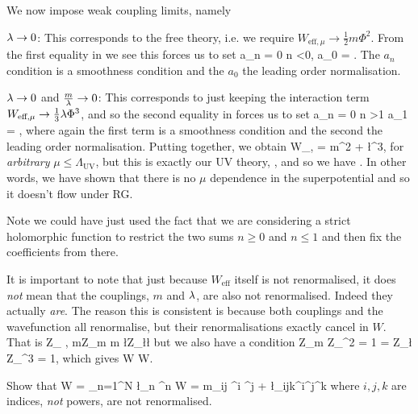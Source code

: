        \item We now impose weak coupling limits, namely 
            \ben
                \item $\lambda\to 0$: This corresponds to the free theory, i.e. we require $W_{\text{eff},\mu} \to \frac{1}{2}m\Phi^2$. From the first equality in  we see this forces us to set 
                \be
                \label{eqn:ana0}
                    a_n = 0 \qquad \forall n <0, \qand a_0 = .
                \ee 
                The $a_n$ condition is a smoothness condition and the $a_0$ the leading order normalisation.
                \item $\lambda\to0$ and $\frac{m}{\lambda}\to 0$: This corresponds to just keeping the interaction term $W_{\text{eff},\mu}\to \frac{1}{3}\lambda \Phi^3$, and so the second equality in  forces us to set 
                \be 
                \label{eqn:ana1}
                    a_n = 0 \qquad \forall n >1 \qand a_1 = ,
                \ee
                where again the first term is a smoothness condition and the second the leading order normalisation.
            \een 
        Putting  together, we obtain 
        \bse 
            W_{,\mu} = m\Phi^2 + \l \Phi^3,
        \ese 
        for \textit{arbitrary} $\mu \leq \Lambda_{\text{UV}}$, but this is exactly our UV theory, , and so we have . In other words, we have shown that there is no $\mu$ dependence in the superpotential and so it doesn't flow under RG. 
    \een
\eq 

\br 
    Note we could have just used the fact that we are considering a strict holomorphic function to restrict the two sums $n\geq 0$ and $n \leq 1$ and then fix the coefficients from there. 
\er 

\br 
    It is important to note that just because $W_{\text{eff}}$ itself is not renormalised, it does \textit{not} mean that the couplings, $m$ and $\lambda$, are also not renormalised. Indeed they actually \textit{are}. The reason this is consistent is because both couplings and the wavefunction all renormalise, but their renormalisations exactly cancel in $W$. That is
    \bse
        \phi \mapsto Z_{\phi} \phi, \qquad m\mapsto Z_m m \qand \l \mapsto Z_{\l}\l 
    \ese 
    but we also have a condition
    \bse 
        Z_m Z_{\phi}^2 = 1 = Z_{\l} Z_{\phi}^3 = 1,
    \ese 
    which gives 
    \bse 
        W \mapsto W. 
    \ese
\er 

\bbox 
    Show that 
    \bse 
        W = \sum_{n=1}^N \l_n \Phi^n \qand W = m_{ij} \Phi^i \Phi^j + \l_{ijk}\Phi^i\Phi^j\Phi^k
    \ese 
    where $i,j,k$ are indices, \textit{not} powers, are not renormalised.
\ebox 